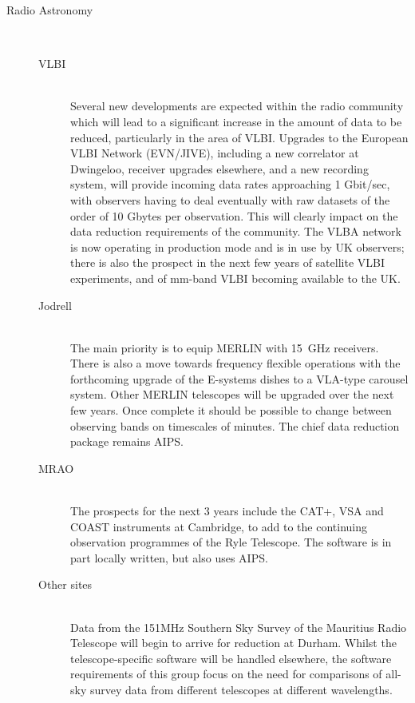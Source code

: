 \begin{description}
\item[Radio Astronomy]\mbox{}\\[-3.0ex]
\begin{description}
\item[VLBI]\mbox{}\\
Several new developments are expected within the radio community which
will lead to a significant increase in the amount of data to be
reduced, particularly in the area of VLBI. Upgrades to the European
VLBI Network (EVN/JIVE), including a new correlator at Dwingeloo,
receiver upgrades elsewhere, and a new recording system, will provide
incoming data rates approaching 1 Gbit/sec, with observers having to
deal eventually with raw datasets of the order of 10 Gbytes per
observation. This will clearly impact on the data reduction
requirements of the community.  The VLBA network is now operating in
production mode and is in use by UK observers; there is also the
prospect in the next few years of satellite VLBI experiments, and of
mm-band VLBI becoming available to the UK.

\item[Jodrell]\mbox{}\\
The main priority is to equip MERLIN with 15~GHz receivers.  There is
also a move towards frequency flexible operations with the forthcoming
upgrade of the E-systems dishes to a VLA-type carousel system. Other
MERLIN telescopes will be upgraded over the next few years. Once
complete it should be possible to change between observing bands on
timescales of minutes. The chief data reduction package remains AIPS.

\item[MRAO]\mbox{}\\
The prospects for the next 3 years include the CAT+, VSA and COAST
instruments at Cambridge, to add to the continuing observation
programmes of the Ryle Telescope. The software is in part locally
written, but also uses AIPS.

\item[Other sites]\mbox{}\\
Data from the 151MHz Southern Sky Survey of the Mauritius Radio
Telescope will begin to arrive for reduction at Durham. Whilst the
telescope-specific software will be handled elsewhere, the software
requirements of this group focus on the need for comparisons of
all-sky survey data from different telescopes at different
wavelengths.


\end{description}
\end{description}

